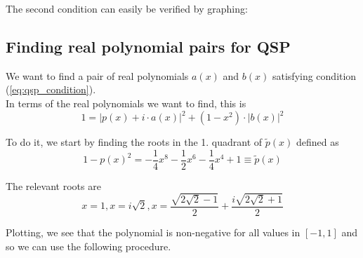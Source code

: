 \documentclass{article}
\begin{document}
\noindent The second condition can easily be verified by graphing:
\begin{center}
\end{center}

%
%

\subsection*{Finding real polynomial pairs for QSP}

\noindent We want to find a pair of real polynomials $a(x)$ and $b(x)$ satisfying condition (\ref{eq:qsp_condition}).\\ 
In terms of the real polynomials we want to find, this is
\begin{equation*}
1 = |p(x) + i \cdot a(x)|^2 + (1-x^2) \cdot |b(x)|^2 
\end{equation*}

\noindent To do it, we start by finding the roots in the 1. quadrant of $\tilde{p}(x)$ defined as
\begin{equation}
1 - p(x)^2 = -\frac{1}{4}x^8 - \frac{1}{2}x^6 - \frac{1}{4}x^4 + 1 \equiv \tilde{p} (x) \label{eq:one_condition}
\end{equation}

\noindent  The relevant roots are
\[ x=1, x=i\sqrt{2}, x= \frac{\sqrt{2\sqrt{2}-1}}{2} + \frac{i\sqrt{2\sqrt{2}+1}}{2} \]

\noindent Plotting, we see that the polynomial is non-negative for all values in $[-1, 1]$ and so we can use the following procedure.
\begin{center}
\end{center}
\end{document}
